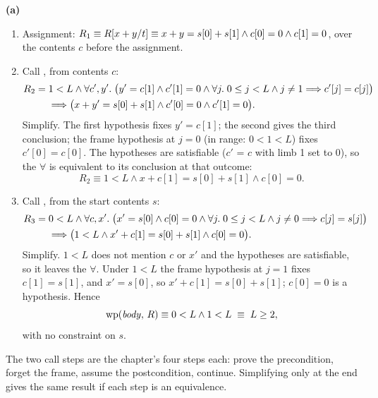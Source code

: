 \documentclass[11pt]{article}
\begin{document}
\textbf{(a)}
\begin{enumerate}
\item Assignment: $R_1 \equiv \subst{R}{t}{x + y} \equiv x + y = s[0] + s[1]
  \wedge c[0] = 0 \wedge c[1] = 0$, over the contents $c$ before the
  assignment.
\item Call , from contents $c$:
  \[ \begin{aligned} R_2 = {} & 1 < L \wedge \forall c', y' .\; \bigl(y' = c[1] \wedge c'[1] = 0
     \wedge \forall j .\; 0 \leq j < L \wedge j \neq 1 \impl c'[j] = c[j]\bigr) \\
     & \impl \bigl(x + y' = s[0] + s[1] \wedge c'[0] = 0 \wedge c'[1] = 0\bigr). \end{aligned} \]
  Simplify. The first hypothesis fixes $y' = c[1]$; the second gives the third
  conclusion; the frame hypothesis at $j = 0$ (in range: $0 < 1 < L$) fixes
  $c'[0] = c[0]$. The hypotheses are satisfiable ($c'$ = $c$ with limb 1 set to
  $0$), so the $\forall$ is equivalent to its conclusion at that outcome:
  \[ R_2 \equiv 1 < L \wedge x + c[1] = s[0] + s[1] \wedge c[0] = 0. \]
\item Call , from the start contents $s$:
  \[ \begin{aligned} R_3 = {} & 0 < L \wedge \forall c, x' .\; \bigl(x' = s[0] \wedge c[0] = 0
     \wedge \forall j .\; 0 \leq j < L \wedge j \neq 0 \impl c[j] = s[j]\bigr) \\
     & \impl \bigl(1 < L \wedge x' + c[1] = s[0] + s[1] \wedge c[0] = 0\bigr). \end{aligned} \]
  Simplify. $1 < L$ does not mention $c$ or $x'$ and the hypotheses are
  satisfiable, so it leaves the $\forall$. Under $1 < L$ the frame hypothesis at
  $j = 1$ fixes $c[1] = s[1]$, and $x' = s[0]$, so $x' + c[1] = s[0] + s[1]$;
  $c[0] = 0$ is a hypothesis. Hence
  \[ \WP{\mathit{body}}{R} \equiv 0 < L \wedge 1 < L \;\equiv\; L \geq 2, \]
  with no constraint on $s$.
\end{enumerate}
The two call steps are the chapter's four steps each: prove the precondition,
forget the frame, assume the postcondition, continue. Simplifying only at the
end gives the same result if each step is an equivalence.
\end{document}
